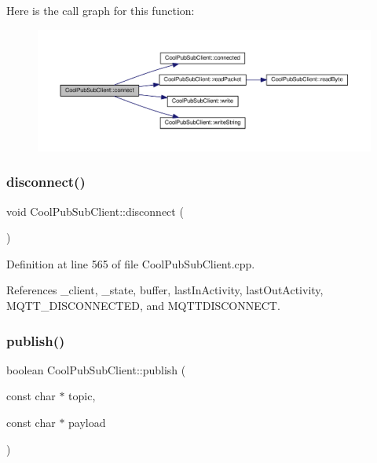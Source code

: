 Here is the call graph for this function\+:
\nopagebreak
\begin{figure}[H]
\begin{center}
\leavevmode
\includegraphics[width=350pt]{d8/d4b/class_cool_pub_sub_client_a7e5a85731dd25d90a41f6d859e61da77_cgraph}
\end{center}
\end{figure}
\mbox{\label{class_cool_pub_sub_client_a60bd133e45bebc921f6df20f45106490}} 
\subsubsection{\texorpdfstring{disconnect()}{disconnect()}}
{\footnotesize\ttfamily void Cool\+Pub\+Sub\+Client\+::disconnect (\begin{DoxyParamCaption}{ }\end{DoxyParamCaption})}



Definition at line 565 of file Cool\+Pub\+Sub\+Client.\+cpp.



References \+\_\+client, \+\_\+state, buffer, last\+In\+Activity, last\+Out\+Activity, M\+Q\+T\+T\+\_\+\+D\+I\+S\+C\+O\+N\+N\+E\+C\+T\+ED, and M\+Q\+T\+T\+D\+I\+S\+C\+O\+N\+N\+E\+CT.

\mbox{\label{class_cool_pub_sub_client_ab6ad5fa2d3db8f91454027257f225a89}} 
\subsubsection{\texorpdfstring{publish()}{publish()}\hspace{0.1cm}{\footnotesize\ttfamily [1/4]}}
{\footnotesize\ttfamily boolean Cool\+Pub\+Sub\+Client\+::publish (\begin{DoxyParamCaption}\item[{const char $\ast$}]{topic,  }\item[{const char $\ast$}]{payload }\end{DoxyParamCaption})}



